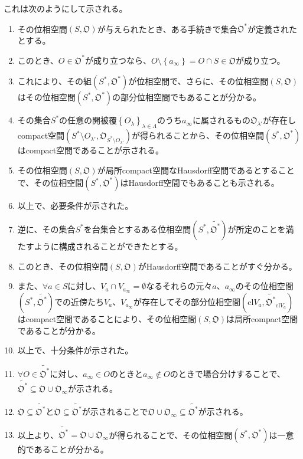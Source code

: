 \documentclass[dvipdfmx]{jsarticle}
\begin{document}
これは次のようにして示される。
\begin{enumerate}
\item
  その位相空間$\left( S,\mathfrak{O} \right)$が与えられたとき、ある手続きで集合$\mathfrak{O}^{*}$が定義されたとする。
\item
  このとき、$O \in \mathfrak{O}^{*}$が成り立つなら、$O \setminus \left\{ a_{\infty} \right\} = O \cap S \in \mathfrak{O}$が成り立つ。
\item
  これにより、その組$\left( S^{*},\mathfrak{O}^{*} \right)$が位相空間で、さらに、その位相空間$\left( S,\mathfrak{O} \right)$はその位相空間$\left( S^{*},\mathfrak{O}^{*} \right)$の部分位相空間でもあることが分かる。
\item
  その集合$S^{*}$の任意の開被覆$\left\{ O_{\lambda} \right\}_{\lambda \in \varLambda}$のうち$a_{\infty}$に属されるもの$\mathfrak{O}_{\lambda'}$が存在しcompact空間$\left( S^{*} \setminus O_{\lambda'},\mathfrak{O}_{S^{*} \setminus O_{\lambda'}} \right)$が得られることから、その位相空間$\left( S^{*},\mathfrak{O}^{*} \right)$はcompact空間であることが示される。
\item
  その位相空間$\left( S,\mathfrak{O} \right)$が局所compact空間なHausdorff空間であるとすることで、その位相空間$\left( S^{*},\mathfrak{O}^{*} \right)$はHausdorff空間でもあることも示される。
\item
  以上で、必要条件が示された。
\item
  逆に、その集合$S^{*}$を台集合とするある位相空間$\left( S^{*},\widetilde{\mathfrak{O}^{*}} \right)$が所定のことを満たすように構成されることができたとする。
\item
  このとき、その位相空間$\left( S,\mathfrak{O} \right)$がHausdorff空間であることがすぐ分かる。
\item
  また、$\forall a \in S$に対し、$V_{a} \cap V_{a_{\infty}} = \emptyset$なるそれらの元々$a$、$a_{\infty}$のその位相空間$\left( S^{*},\widetilde{\mathfrak{O}^{*}} \right)$での近傍たち$V_{a}$、$V_{a_{\infty}}$が存在してその部分位相空間$\left( {\mathrm{cl}}V_{a},{\widetilde{\mathfrak{O}^{*}}}_{{\mathrm{cl}}V_{a}} \right)$はcompact空間であることにより、その位相空間$\left( S,\mathfrak{O} \right)$は局所compact空間であることが分かる。
\item
  以上で、十分条件が示された。
\item
  $\forall O \in \widetilde{\mathfrak{O}^{*}}$に対し、$a_{\infty} \in O$のときと$a_{\infty} \notin O$のときで場合分けすることで、$\widetilde{\mathfrak{O}^{*}}\subseteq \mathfrak{O \cup}\mathfrak{O}_{\infty}$が示される。
\item
  $\mathfrak{O \subseteq}\widetilde{\mathfrak{O}^{*}}$と$\mathfrak{O \subseteq}\widetilde{\mathfrak{O}^{*}}$が示されることで$\mathfrak{O \cup}\mathfrak{O}_{\infty} \subseteq \widetilde{\mathfrak{O}^{*}}$が示される。
\item
  以上より、$\widetilde{\mathfrak{O}^{*}} = \mathfrak{O \cup}\mathfrak{O}_{\infty}$が得られることで、その位相空間$\left( S^{*},\mathfrak{O}^{*} \right)$は一意的であることが分かる。
\end{enumerate}
\end{document}
